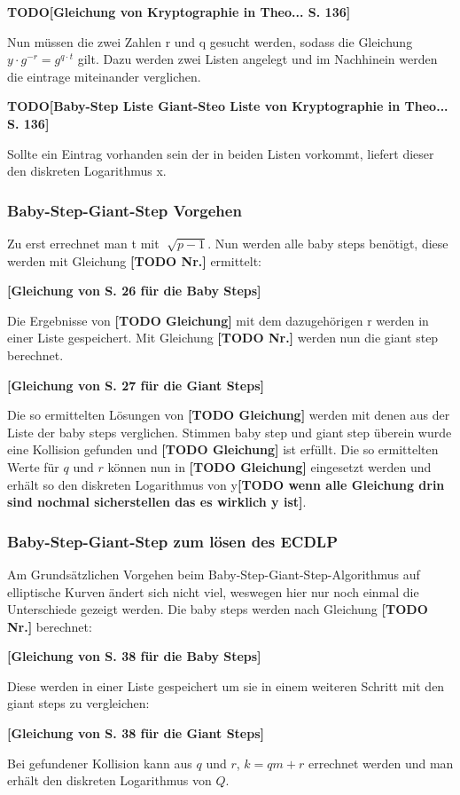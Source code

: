 		\textbf{TODO[Gleichung von Kryptographie in Theo... S. 136]}
		
		Nun müssen die zwei Zahlen r und q gesucht werden, sodass die Gleichung $y \cdot g^{-r} = g^{q \cdot t}$ gilt. Dazu werden zwei Listen angelegt und im Nachhinein werden die eintrage miteinander verglichen. 
		
		\textbf{TODO[Baby-Step Liste Giant-Steo Liste von Kryptographie in Theo... S. 136]}
		
		Sollte ein Eintrag vorhanden sein der in beiden Listen vorkommt, liefert dieser den diskreten Logarithmus x.~\cite{Kryptografie:in:Theorie:und:Praxis}
		
		\subsubsection{Baby-Step-Giant-Step Vorgehen}
			Zu erst errechnet man t mit $\sqrt[]{p-1}$. Nun werden alle baby steps benötigt, diese werden mit Gleichung \textbf{[TODO Nr.]} ermittelt:
			
			\textbf{[Gleichung von \cite{DLP:ECDLP:Probleme:und:Loesungen} S. 26 für die Baby Steps]}
			
			Die Ergebnisse von \textbf{[TODO Gleichung]} mit dem dazugehörigen r werden in einer Liste gespeichert. Mit Gleichung \textbf{[TODO Nr.]} werden nun die giant step berechnet.
			
			\textbf{[Gleichung von \cite{DLP:ECDLP:Probleme:und:Loesungen} S. 27 für die Giant Steps]}
			
			Die so ermittelten Lösungen von \textbf{[TODO Gleichung]} werden mit denen aus der Liste der baby steps verglichen. Stimmen baby step und giant step überein wurde eine Kollision gefunden und \textbf{[TODO Gleichung]} ist erfüllt. Die so ermittelten Werte für $q$ und $r$ können nun in \textbf{[TODO Gleichung]} eingesetzt werden und erhält so den diskreten Logarithmus von y\textbf{[TODO wenn alle Gleichung drin sind nochmal sicherstellen das es wirklich y ist]}.
		\subsubsection{Baby-Step-Giant-Step zum lösen des ECDLP}
			Am Grundsätzlichen Vorgehen beim Baby-Step-Giant-Step-Algorithmus auf elliptische Kurven ändert sich nicht viel, weswegen hier nur noch einmal die Unterschiede gezeigt werden. Die baby steps werden nach Gleichung \textbf{[TODO Nr.]} berechnet:
			
			\textbf{[Gleichung von \cite{DLP:ECDLP:Probleme:und:Loesungen} S. 38 für die Baby Steps]}
			
			Diese werden in einer Liste gespeichert um sie in einem weiteren Schritt mit den giant steps zu vergleichen:
			
			\textbf{[Gleichung von \cite{DLP:ECDLP:Probleme:und:Loesungen} S. 38 für die Giant Steps]}
			
			Bei gefundener Kollision kann aus $q$ und $r$, $k = qm + r$ errechnet werden und man erhält den diskreten Logarithmus von $Q$.